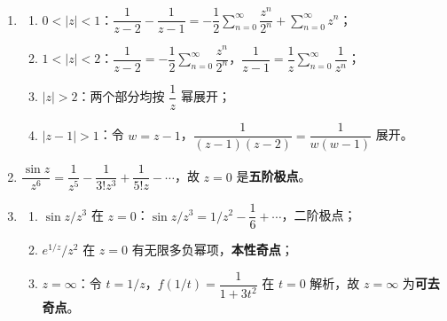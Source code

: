 \begin{enumerate}
\begin{enumerate}
  \def\labelenumii{(\arabic{enumii})}
  \tightlist
  \item
    \(R=1\)； (2) 用比值法：\(R=e\)； (3)
    \(|1+i|=\sqrt2\)，\(R=1/\sqrt2\)； (4) \(|e^{in\pi}|=1\)，\(R=1\)；
    (5)(6) 酌情化简，一般化为后项比值判断。
  \end{enumerate}
\item
  \begin{enumerate}
  \def\labelenumii{(\arabic{enumii})}
  \tightlist
  \item
    \(0<|z|<1\)：\(\dfrac1{z-2}-\dfrac1{z-1}=-\dfrac12\sum_{n=0}^\infty\dfrac{z^n}{2^n}+\sum_{n=0}^\infty z^n\)；
  \item
    \(1<|z|<2\)：\(\dfrac1{z-2}=-\dfrac12\sum_{n=0}^\infty\dfrac{z^n}{2^n}\)，\(\dfrac1{z-1}=\dfrac1z\sum_{n=0}^\infty\dfrac1{z^n}\)；
  \item
    \(|z|>2\)：两个部分均按 \(\dfrac1z\) 幂展开；
  \item
    \(|z-1|>1\)：令 \(w=z-1\)，\(\dfrac1{(z-1)(z-2)}=\dfrac1{w(w-1)}\)
    展开。
  \end{enumerate}
\item
  \(\dfrac{\sin z}{z^6}=\dfrac1{z^5}-\dfrac{1}{3!z^3}+\dfrac{1}{5!z}-\cdots\)，故
  \(z=0\) 是\textbf{五阶极点}。
\item
  \begin{enumerate}
  \def\labelenumii{(\arabic{enumii})}
  \tightlist
  \item
    \(\sin z/z^3\) 在
    \(z=0\)：\(\sin z/z^3=1/z^2-\dfrac1{6}+\cdots\)，二阶极点；
  \item
    \(e^{1/z}/z^2\) 在 \(z=0\) 有无限多负幂项，\textbf{本性奇点}；
  \item
    \(z=\infty\)：令 \(t=1/z\)，\(f(1/t)=\dfrac{1}{1+3t^2}\) 在 \(t=0\)
    解析，故 \(z=\infty\) 为\textbf{可去奇点}。
  \end{enumerate}
\end{enumerate}
